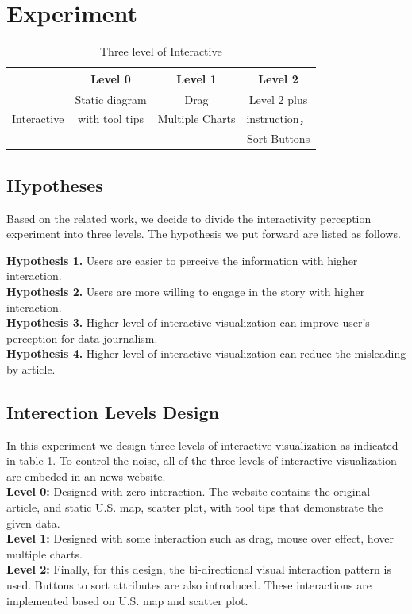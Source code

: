 \documentclass[9pt,journal,compsoc]{IEEEtran}
\begin{document}
\section{Experiment}
\large
\begin{table}
	\centering
		\begin{tabular}{|c|c|c|c|}
		\hline
     	&Level 0&Level 1&Level 2\\
     	\hline
            		&Static diagram&Drag & Level 2 plus\\ 
        Interactive& with tool tips&Multiple Charts&instruction，\\
					&             &   			&Sort Buttons\\
     	\hline
        \end{tabular}
     \caption{Three level of Interactive}
\end{table}
\subsection{Hypotheses}
Based on the related work, we decide to divide the interactivity perception experiment into three levels. The hypothesis we put forward are listed as follows.

\textbf{Hypothesis 1.} Users are easier to perceive the information with higher interaction.\\
\textbf{Hypothesis 2.} Users are more willing to engage in the story with higher interaction.\\
\textbf{Hypothesis 3.} Higher level of interactive visualization can improve user's perception for data journalism.\\
\textbf{Hypothesis 4.} Higher level of interactive visualization can reduce the misleading by article.\\

\subsection{Interection Levels Design}
In this experiment we design three levels of interactive visualization as indicated in table 1. To control the noise, all of the three levels of interactive visualization are embeded in an news website.\\
\textbf{Level 0:} Designed with zero interaction. The website contains the original article, and static U.S. map, scatter plot, with tool tips that demonstrate the given data. \\
\textbf{Level 1:} Designed with some interaction such as drag, mouse over effect, hover multiple charts. \\
\textbf{Level 2:} Finally, for this design, the bi-directional visual interaction pattern is used. Buttons to sort attributes are also introduced. These interactions are implemented based on U.S. map and scatter plot.
\end{document}
